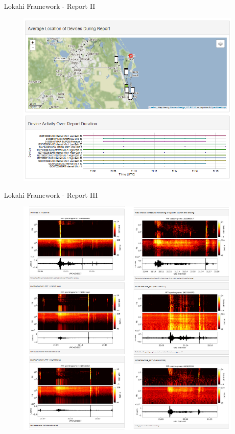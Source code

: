 \documentclass{beamer}
\begin{document}
\begin{frame}{Lokahi Framework - Report II}
\begin{figure}
	\includegraphics[width=.90\textwidth]{img/report2.png}
\end{figure}
\end{frame}

\begin{frame}{Lokahi Framework - Report III}
\begin{figure}
	\includegraphics[width=.60\textwidth]{img/signals.png}
\end{figure}
\end{frame}
\end{document}
